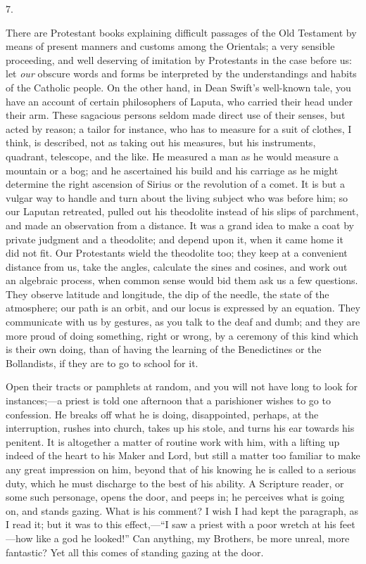 7.

There are Protestant books explaining difficult
passages of the Old Testament by means of present manners
and customs among the Orientals; a very sensible
proceeding, and well deserving of imitation by
Protestants in the case before us: let \emph{our}
obscure words and forms be interpreted by the
understandings and habits of the Catholic people. On the
other hand, in Dean Swift's well-known tale, you have an
account of certain philosophers of Laputa, who carried
their head under their arm. These sagacious persons
seldom made direct use of their senses, but acted by
reason; a tailor for instance, who has to measure for a
suit of clothes, I think, is described, not as taking out
his measures, but his instruments, quadrant, telescope,
and the like. He measured a man as he would measure a
mountain or a bog; and he ascertained his build and his
carriage as he might determine the right ascension of
Sirius or the revolution of a comet. It is but a vulgar
way to handle and turn about the living subject who was
before him; so our Laputan retreated, pulled out his
theodolite instead of his slips of parchment, and made an
observation from a distance. It was a grand idea to make
a coat by private judgment and a theodolite; and depend
upon it, when it came home it did not fit. Our
Protestants wield the theodolite too; they keep at a
convenient distance from us, take the angles, calculate
the sines and cosines, and work out an algebraic process,
when common sense would bid them ask us a few questions.
They observe latitude and longitude, the dip of the
needle, the state of the atmosphere; our path is an
orbit, and our locus is expressed by an equation. They
communicate with us by gestures, as you talk to the deaf
and dumb; and they are more proud of doing something,
right or wrong, by a ceremony of this kind which is their
own doing, than of having the learning of the
Benedictines or the Bollandists, if they are to go to
school for it.

Open their tracts or pamphlets at random, and you will
not have long to look for instances;—a priest is told
one afternoon that a parishioner wishes to go to
confession. He breaks off what he is doing, disappointed,
perhaps, at the interruption, rushes into church, takes
up his stole, and turns his ear towards his penitent. It
is altogether a matter of routine work with him, with a
lifting up indeed of the heart to his Maker and Lord, but
still a matter too familiar to make any great impression
on him, beyond that of his knowing he is called to a
serious duty, which he must discharge to the best of his
ability. A Scripture reader, or some such personage,
opens the door, and peeps in; he perceives what is going
on, and stands gazing. What is his comment? I wish I had kept the paragraph, as I read it; but it was to this
effect,—``I saw a priest with a poor wretch at his feet—how like a god he looked!'' Can anything, my
Brothers, be more unreal, more fantastic? Yet all this
comes of standing gazing at the door.

